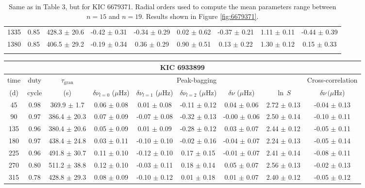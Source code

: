 \documentclass[twocolumn]{aastex61}%
\begin{document}
\begin{table*}[ht]
\begin{tabular}{ccc|ccccc|c}
1335 & 0.85 & 428.3 $\pm$ 20.6 & -0.42 $\pm$ 0.31 & -0.34 $\pm$ 0.29 & 0.02 $\pm$ 0.62 & -0.37 $\pm$ 0.21 & 1.11 $\pm$ 0.11 & -0.44 $\pm$ 0.39\\
1380 & 0.85 & 406.5 $\pm$ 29.2 & -0.19 $\pm$ 0.34 & 0.36 $\pm$ 0.29 & 0.90 $\pm$ 0.51 & 0.13 $\pm$ 0.22 & 1.30 $\pm$ 0.12 & 0.15 $\pm$ 0.33\\\vspace{-0.3cm}
\end{tabular}
\caption{Same as in Table 3, but for KIC 6679371. Radial orders used to compute the mean parameters range between $n=15$ and $n=19$. Results shown in Figure \ref{fig:6679371}.}\label{tab:6679371}\vspace{-2cm}
\end{table*}

\begin{table*}[ht]\centering\fontsize{9.}{7.}\selectfont
\begin{tabular}{ccc|ccccc|c}
\multicolumn{9}{c}{KIC 6933899}\\ \hline\hline
time & duty & $\tau_\text{gran}$ &\multicolumn{5}{c|}{Peak-bagging}&Cross-correlation\\
(d)& cycle & (s)&$\delta\nu_{l=0}$ ($\mu$Hz) & $\delta\nu_{l=1}$ ($\mu$Hz) & $\delta\nu_{l=2}$ ($\mu$Hz) & $\delta\nu$ ($\mu$Hz)& $\ln\,S$ & $\delta\nu\,(\mu$Hz)\\\hline
45 & 0.98 & 369.9 $\pm$ 1.7 & 0.06 $\pm$ 0.08 & 0.01 $\pm$ 0.08 & -0.11 $\pm$ 0.12 & 0.04 $\pm$ 0.06 & 2.72 $\pm$ 0.13 & -0.04 $\pm$ 0.13\\
90 & 0.97 & 386.4 $\pm$ 20.3 & 0.07 $\pm$ 0.09 & -0.07 $\pm$ 0.08 & -0.32 $\pm$ 0.13 & -0.00 $\pm$ 0.06 & 2.50 $\pm$ 0.14 & -0.10 $\pm$ 0.11\\
135 & 0.96 & 380.4 $\pm$ 20.6 & 0.05 $\pm$ 0.09 & 0.01 $\pm$ 0.09 & -0.28 $\pm$ 0.12 & 0.03 $\pm$ 0.07 & 2.44 $\pm$ 0.12 & -0.05 $\pm$ 0.11\\
180 & 0.97 & 438.4 $\pm$ 24.8 & 0.03 $\pm$ 0.11 & -0.10 $\pm$ 0.10 & -0.02 $\pm$ 0.16 & -0.04 $\pm$ 0.07 & 2.24 $\pm$ 0.13 & -0.05 $\pm$ 0.14\\
225 & 0.96 & 491.8 $\pm$ 30.7 & 0.11 $\pm$ 0.10 & -0.12 $\pm$ 0.10 & 0.17 $\pm$ 0.15 & -0.01 $\pm$ 0.07 & 2.41 $\pm$ 0.14 & -0.08 $\pm$ 0.11\\
270 & 0.80 & 511.2 $\pm$ 38.8 & 0.12 $\pm$ 0.10 & -0.03 $\pm$ 0.11 & 0.18 $\pm$ 0.14 & 0.05 $\pm$ 0.07 & 2.56 $\pm$ 0.13 & -0.02 $\pm$ 0.13\\
315 & 0.78 & 428.8 $\pm$ 29.3 & 0.08 $\pm$ 0.09 & -0.10 $\pm$ 0.12 & 0.01 $\pm$ 0.18 & 0.01 $\pm$ 0.07 & 2.40 $\pm$ 0.12 & -0.05 $\pm$ 0.12\\

\end{tabular}
\end{table*}
\end{document}
